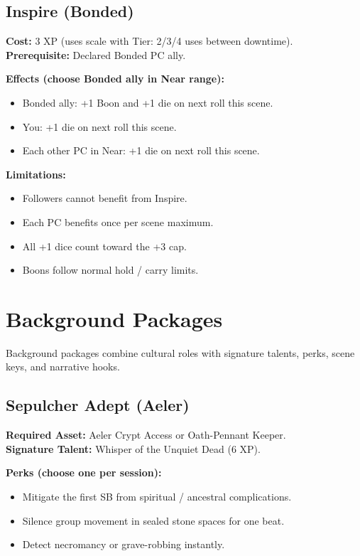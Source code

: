 \subsection{Inspire (Bonded)}\label{subsec:inspire_talent}

\textbf{Cost:} 3 XP (uses scale with Tier: 2/3/4 uses between downtime).\\
\textbf{Prerequisite:} Declared Bonded PC ally.

\textbf{Effects (choose Bonded ally in Near range):}
\begin{itemize}
    \item Bonded ally: +1 Boon and +1 die on next roll this scene.
    \item You: +1 die on next roll this scene.
    \item Each other PC in Near: +1 die on next roll this scene.
\end{itemize}

\textbf{Limitations:}
\begin{itemize}
    \item Followers cannot benefit from Inspire.
    \item Each PC benefits once per scene maximum.
    \item All +1 dice count toward the +3 cap.
    \item Boons follow normal hold / carry limits.
\end{itemize}

\section{Background Packages}\label{sec:background_packages}

Background packages combine cultural roles with signature talents, perks, scene keys, and narrative hooks.

\subsection{Sepulcher Adept (Aeler)}\label{subsec:sepulcher_adept}

\textbf{Required Asset:} Aeler Crypt Access or Oath-Pennant Keeper.\\
\textbf{Signature Talent:} Whisper of the Unquiet Dead (6 XP).

\textbf{Perks (choose one per session):}
\begin{itemize}
    \item Mitigate the first SB from spiritual / ancestral complications.
    \item Silence group movement in sealed stone spaces for one beat.
    \item Detect necromancy or grave-robbing instantly.
\end{itemize}

